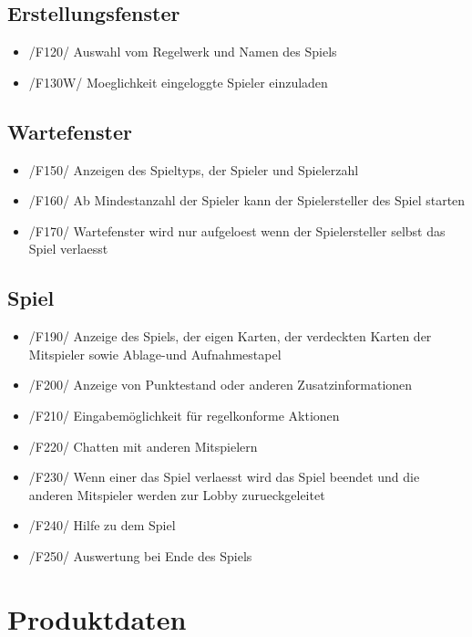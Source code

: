 \documentclass{article}
\begin{document}
\subsection{Erstellungsfenster}
\begin{itemize}
	\item /F120/ Auswahl vom Regelwerk und  Namen des Spiels 
	\item /F130W/ Moeglichkeit eingeloggte Spieler einzuladen
\end{itemize}

\subsection{Wartefenster}
\begin{itemize}
	\item /F150/ Anzeigen des Spieltyps, der Spieler und Spielerzahl
	\item /F160/ Ab Mindestanzahl der Spieler kann der Spielersteller des Spiel starten
	\item /F170/ Wartefenster wird nur aufgeloest wenn der Spielersteller selbst das Spiel verlaesst
\end{itemize}

\subsection{Spiel}
\begin{itemize}
	\item /F190/ Anzeige des Spiels, der eigen Karten, der verdeckten Karten der Mitspieler sowie Ablage-und Aufnahmestapel
	\item /F200/ Anzeige von Punktestand oder anderen Zusatzinformationen
	\item /F210/ Eingabemöglichkeit für regelkonforme Aktionen
	\item /F220/ Chatten mit anderen Mitspielern
	\item /F230/ Wenn einer das Spiel verlaesst wird das Spiel beendet und die anderen Mitspieler werden zur Lobby zurueckgeleitet
	\item /F240/ Hilfe zu dem Spiel
	\item /F250/ Auswertung bei Ende des Spiels
\end{itemize}

\section{Produktdaten}
\end{document}
